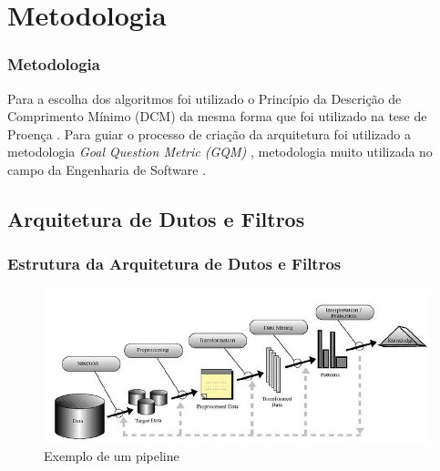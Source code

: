 \section{Metodologia}


\begin{frame}

    \frametitle{Metodologia}

    Para a escolha dos algoritmos foi utilizado o Princípio da Descrição de Comprimento Mínimo (DCM) da mesma forma que foi utilizado na tese de Proença \cite{proencca2021robust}.
    \newline
    \newline
    Para guiar o processo de criação da arquitetura foi utilizado a metodologia \textit{Goal Question Metric (GQM)} \cite{caldiera1994goal}, metodologia muito utilizada no campo da Engenharia de Software \cite{sommerville2011software}.

\end{frame}

\subsection{Arquitetura de Dutos e Filtros}
\begin{frame}

    \frametitle{Estrutura da Arquitetura de Dutos e Filtros}

    \begin{figure}[!htbp]
                \centering
       	    \caption{Exemplo de um pipeline}
       	    \includegraphics[scale=0.65]{imagens/pipeline.png}
            \end{figure}

\end{frame}


